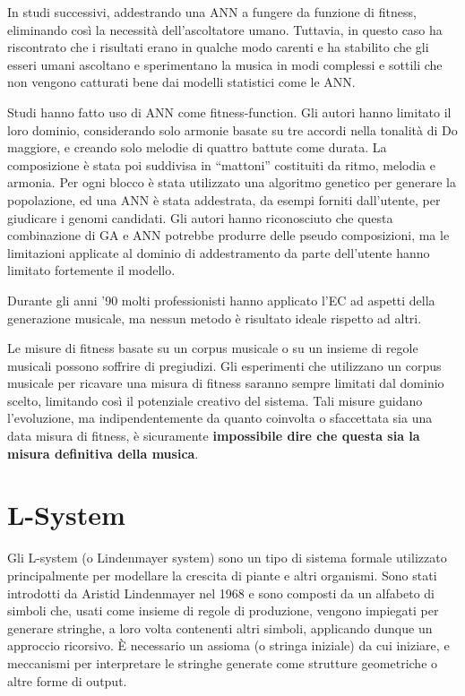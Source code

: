 \documentclass[a4paper,12pt]{report}
\begin{document}
In studi successivi, addestrando una ANN a fungere da funzione di fitness, eliminando così la necessità dell'ascoltatore umano.
Tuttavia, in questo caso ha riscontrato che i risultati erano in qualche modo carenti e ha stabilito che gli esseri umani ascoltano e sperimentano la musica in modi complessi e sottili che non vengono catturati bene dai modelli statistici come le ANN. 

Studi hanno fatto uso di ANN come fitness-function. 
Gli autori hanno limitato il loro dominio, considerando solo armonie basate su tre accordi nella tonalità di Do maggiore, e creando solo melodie di quattro battute come durata. 
La composizione è stata poi suddivisa in “mattoni” costituiti da ritmo, melodia e armonia. 
Per ogni blocco è stata utilizzato una algoritmo genetico per generare la popolazione, ed una ANN è stata addestrata, da esempi forniti dall'utente, per giudicare i genomi candidati.
Gli autori hanno riconosciuto che questa combinazione di GA e ANN potrebbe produrre delle pseudo composizioni, 
ma le limitazioni applicate al dominio di addestramento da parte dell'utente hanno limitato fortemente il modello.

Durante gli anni ’90 molti professionisti hanno applicato l’EC ad aspetti della generazione musicale, ma nessun metodo è risultato ideale rispetto ad altri. 

Le misure di fitness basate su un corpus musicale o su un insieme di regole musicali possono soffrire di pregiudizi. 
Gli esperimenti che utilizzano un corpus musicale per ricavare una misura di fitness saranno sempre limitati dal dominio scelto, limitando così il potenziale creativo del sistema. 
Tali misure guidano l’evoluzione, ma indipendentemente da quanto coinvolta o sfaccettata sia una data misura di fitness, è sicuramente \textbf{impossibile dire che questa sia la misura definitiva della musica}.

\section{L-System}

Gli L-system (o Lindenmayer system) sono un tipo di sistema formale utilizzato principalmente per modellare la crescita di piante e altri organismi. 
Sono stati introdotti da Aristid Lindenmayer nel 1968 e sono composti da un alfabeto di simboli che, usati come insieme di regole di produzione, vengono impiegati per generare stringhe, a loro volta contenenti altri simboli, applicando dunque un approccio ricorsivo.
È necessario un assioma (o stringa iniziale) da cui iniziare, e meccanismi per interpretare le stringhe generate come strutture geometriche o altre forme di output.
\end{document}
